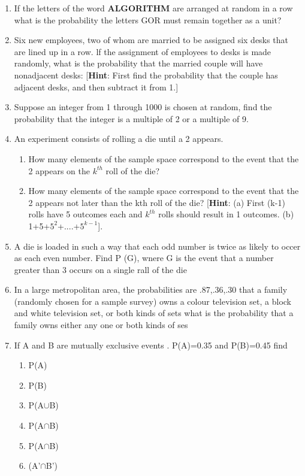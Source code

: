 \documentclass[12pt]{article}
\begin{document}
\begin{enumerate}
\item If the letters of the word \textbf{ALGORITHM} are arranged at random in a row what is the probability the letters GOR must remain together as a unit?
\item Six new employees, two of whom are married to be assigned six desks that are lined up in a row. lf the assignment of employees to desks is made randomly, what is the probability that the married couple will have nonadjacent desks:
[\textbf{Hint}: First find the probability that the couple has adjacent desks, and then subtract it from 1.]
\item Suppose an integer from 1 through 1000 is chosen at random, find the probability that the integer is a multiple of 2 or a multiple of 9.
\item An experiment consists of rolling a die until a 2 appears.
\begin{enumerate}
\item How many elements of the sample space correspond to the event that the 2 appears on the $k^{th}$ roll of the die?
\item How many elements of the sample space correspond to the event that the 2
appears not later than the kth roll of the die?
[\textbf{Hint}: (a) First (k-1) rolls have 5 outcomes each and $k^{th}$ rolls should result in 1 outcomes. (b) 1+5+$5^2$+....+$5^{k-1}$].
\end{enumerate}
\item A die is loaded in such a way that each odd number is twice as likely to occer as each even number. Find P (G), wnere G is the event that a number greater than 3 occurs on a  single rall of the die
\item In a large metropolitan area, the probabilities are .87,.36,.30 that a family (randomly chosen for a sample survey) owns a colour television set, a block and white television set, or both kinds of sets what is the probability that a family owns either any one or both kinds of ses
\item  If A and B are mutually exclusive events . P(A)=0.35 and P(B)=0.45 find
\begin{enumerate}
\item P(A)
\item P(B)
\item P(A$\cup$B)
\item P(A$\cap$B)
\item P(A$\cap$B)
\item (A'$\cap$B')
\end{enumerate}

\end{enumerate}
\end{document}

